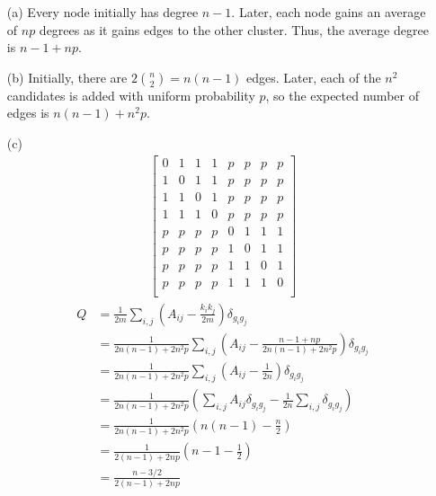 \documentclass{article}
\begin{document}
\begin{enumerate}
  \item[(a)]
  Every node initially has degree \( n - 1 \). Later, each node gains an average
  of \( np \) degrees as it gains edges to the other cluster. Thus, the average
  degree is \( \boxed{n - 1 + np} \).

  \item[(b)]
  Initially, there are \( 2 \binom{n}{2} = n(n - 1) \) edges. Later, each of the
  \( n^2 \) candidates is added with uniform probability \( p \), so the
  expected number of edges is \( \boxed{n(n - 1) + n^2 p} \).

  \item[(c)]
  \begin{gather*}
    \begin{bmatrix}
      0 & 1 & 1 & 1 & p & p & p & p \\
      1 & 0 & 1 & 1 & p & p & p & p \\
      1 & 1 & 0 & 1 & p & p & p & p \\
      1 & 1 & 1 & 0 & p & p & p & p \\
      p & p & p & p & 0 & 1 & 1 & 1 \\
      p & p & p & p & 1 & 0 & 1 & 1 \\
      p & p & p & p & 1 & 1 & 0 & 1 \\
      p & p & p & p & 1 & 1 & 1 & 0 \\
    \end{bmatrix}
  \end{gather*}
  \begin{align*}
    Q &= \frac{1}{2m} \sum_{i,j} \left( A_{ij} - \frac{k_i k_j}{2m} \right) \delta_{g_i g_j} \\
    &= \frac{1}{2n(n - 1) + 2n^2 p} \sum_{i,j} \left( A_{ij} - \frac{n - 1 + np}{2n(n - 1) + 2n^2 p} \right) \delta_{g_i g_j} \\
    &= \frac{1}{2n(n - 1) + 2n^2 p} \sum_{i,j} \left( A_{ij} - \frac{1}{2n} \right) \delta_{g_i g_j} \\
    &= \frac{1}{2n(n - 1) + 2n^2 p} \left( \sum_{i,j} A_{ij} \delta_{g_i g_j} - \frac{1}{2n} \sum_{i,j} \delta_{g_i g_j} \right) \\
    &= \frac{1}{2n(n - 1) + 2n^2 p} \left( n(n - 1) - \frac{n}{2} \right) \\
    &= \frac{1}{2(n - 1) + 2n p} \left( n - 1 - \frac{1}{2} \right) \\
    &= \boxed{\frac{n - 3/2}{2(n - 1) + 2n p}}
  \end{align*}
\end{enumerate}
\end{document}
